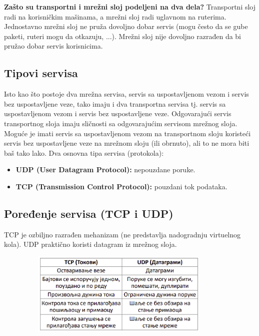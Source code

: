 \documentclass[a4paper]{article}
\begin{document}
    \textbf{Zašto su transportni i mrežni sloj podeljeni na dva dela?} Transportni sloj 
    radi na korisničkim mašinama, a mrežni sloj radi uglavnom na ruterima. Jednostavno 
    mrežni sloj ne pruža dovoljno dobar servis (mogu često da se gube paketi, ruteri mogu
    da otkazuju, ...). Mrežni sloj nije dovoljno razrađen da bi pružao dobar servis korisnicima.

    \subsection{Tipovi servisa}
        Isto kao što postoje dva mrežna servisa, servis sa uspostavljenom vezom i servis bez
        uspostavljene veze, tako imaju i dva transportna servisa tj. servis sa uspostavljenom vezom
        i servis bez uspostavljene veze. Odgovarajući servis transportnog sloja imaju sličnosti
        sa odgovarajućim servisom mrežnog sloja. Moguće je imati servis sa uspostavljenom vezom
        na transportnom sloju koristeći servis bez uspostavljene veze na mrežnom sloju (ili 
        obrnuto), ali to ne mora biti baš tako lako. Dva osnovna tipa servisa (protokola):
        \begin{itemize}
            \item \textbf{UDP (User Datagram Protocol):} nepouzdane poruke.
            \item \textbf{TCP (Transmission Control Protocol):} pouzdani tok podataka.
        \end{itemize}

    \subsection{Poređenje servisa (TCP i UDP)}
        TCP je ozbiljno razrađen mehanizam (ne predstavlja nadogradnju virtuelnog kola). UDP
        praktično koristi datagram iz mrežnog sloja.
        \begin{figure}[H]
            \begin{center}
                \includegraphics[width=100mm,height=40mm]{Slike/tcp_udp.png}
            \end{center}
        \end{figure} 
\end{document}
